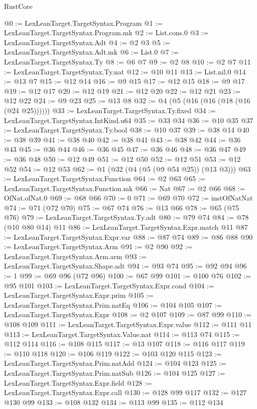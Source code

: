 \begin{lexlean}{RustCore}
\begin{coremodule}
@0 := LexLeanTarget.TargetSyntax.Program
@1 := LexLeanTarget.TargetSyntax.Program.mk
@2 := List.cons.{0}
@3 := LexLeanTarget.TargetSyntax.Adt
@4 := @2 @3
@5 := LexLeanTarget.TargetSyntax.Adt.mk
@6 := List.{0}
@7 := LexLeanTarget.TargetSyntax.Ty
@8 := @6 @7
@9 := @2 @8
@10 := @2 @7
@11 := LexLeanTarget.TargetSyntax.Ty.nat
@12 := @10 @11
@13 := List.nil.{0}
@14 := @13 @7
@15 := @12 @14
@16 := @9 @15
@17 := @12 @15
@18 := @9 @17
@19 := @12 @17
@20 := @12 @19
@21 := @12 @20
@22 := @12 @21
@23 := @12 @22
@24 := @9 @23
@25 := @13 @8
@32 := @4 (@5 (@16 (@16 (@18 (@16 (@24 @25))))))
@33 := LexLeanTarget.TargetSyntax.Ty.fixed
@34 := LexLeanTarget.TargetSyntax.IntKind.u64
@35 := @33 @34
@36 := @10 @35
@37 := LexLeanTarget.TargetSyntax.Ty.bool
@38 := @10 @37
@39 := @38 @14
@40 := @38 @39
@41 := @38 @40
@42 := @38 @41
@43 := @38 @42
@44 := @36 @43
@45 := @36 @44
@46 := @36 @45
@47 := @36 @46
@48 := @36 @47
@49 := @36 @48
@50 := @12 @49
@51 := @12 @50
@52 := @12 @51
@53 := @12 @52
@54 := @12 @53
@62 := @1 (@32 (@4 (@5 (@9 @54 @25)) (@13 @3)))
@63 := LexLeanTarget.TargetSyntax.Function
@64 := @2 @63
@65 := LexLeanTarget.TargetSyntax.Function.mk
@66 := Nat
@67 := @2 @66
@68 := OfNat.ofNat.{0}
@69 := @68 @66
@70 := 0
@71 := @69 @70
@72 := instOfNatNat
@74 := @71 (@72 @70)
@75 := @67 @74
@76 := @13 @66
@78 := @65 (@75 @76)
@79 := LexLeanTarget.TargetSyntax.Ty.adt
@80 := @79 @74
@84 := @78 (@10 @80 @14) @11
@86 := LexLeanTarget.TargetSyntax.Expr.match @11
@87 := LexLeanTarget.TargetSyntax.Expr.var
@88 := @87 @74
@89 := @86 @88
@90 := LexLeanTarget.TargetSyntax.Arm
@91 := @2 @90
@92 := LexLeanTarget.TargetSyntax.Arm.arm
@93 := LexLeanTarget.TargetSyntax.Shape.adt
@94 := @93 @74
@95 := @92 @94
@96 := 1
@99 := @69 @96 (@72 @96)
@100 := @67 @99
@101 := @100 @76
@102 := @95 @101
@103 := LexLeanTarget.TargetSyntax.Expr.cond
@104 := LexLeanTarget.TargetSyntax.Expr.prim
@105 := LexLeanTarget.TargetSyntax.Prim.natEq
@106 := @104 @105
@107 := LexLeanTarget.TargetSyntax.Expr
@108 := @2 @107
@109 := @87 @99
@110 := @108 @109
@111 := LexLeanTarget.TargetSyntax.Expr.value
@112 := @111 @11
@113 := LexLeanTarget.TargetSyntax.Value.nat
@114 := @113 @74
@115 := @112 @114
@116 := @108 @115
@117 := @13 @107
@118 := @116 @117
@119 := @110 @118
@120 := @106 @119
@122 := @103 @120 @115
@123 := LexLeanTarget.TargetSyntax.Prim.natAdd
@124 := @104 @123
@125 := LexLeanTarget.TargetSyntax.Prim.natSub
@126 := @104 @125
@127 := LexLeanTarget.TargetSyntax.Expr.field
@128 := LexLeanTarget.TargetSyntax.Expr.call
@130 := @128 @99 @117
@132 := @127 @130 @99
@133 := @108 @132
@134 := @113 @99
@135 := @112 @134

\end{coremodule}
\end{lexlean}
